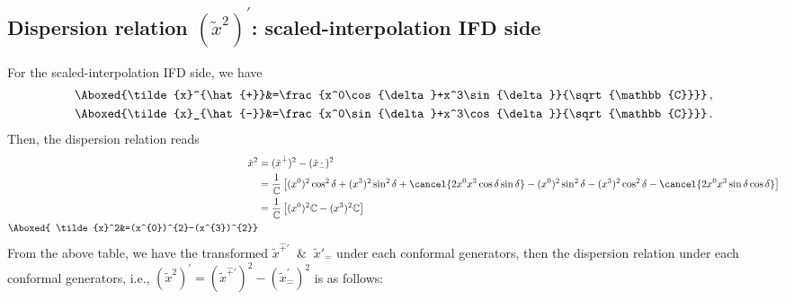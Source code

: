 \documentclass[]{article}
\numberwithin{equation}{section}
\begin{document}
{{\subsection{Dispersion relation $(\tilde{x}^2)^{\prime}$: scaled-interpolation IFD side}
For the scaled-interpolation IFD side, we have
\begin{align}
    \Aboxed{\tilde{x}^{\hat{+}}&=\frac{x^0\cos{\delta}+x^3\sin{\delta}}{\sqrt{\mathbb{C}}}}\,,\\
    \Aboxed{\tilde{x}_{\hat{-}}&=\frac{x^0\sin{\delta}+x^3\cos{\delta}}{\sqrt{\mathbb{C}}}}\,.
\end{align}
Then, the dispersion relation reads
\begin{align}
    \tilde{x}^2&=(\tilde{x}^{\hat{+}})^2-(\tilde{x}_{\hat{-}})^2\\
    &=\frac{1}{\mathbb{C}}\left[(x^0)^{2}\cos^{2}{\delta}+(x^3)^{2}\sin^{2}{\delta}+\cancel{2x^{0}x^{3}\cos{\delta}\sin{\delta}}-(x^0)^{2}\sin^{2}{\delta}-(x^3)^{2}\cos^{2}{\delta}-\cancel{2x^{0}x^{3}\sin{\delta}\cos{\delta}}\right]\\
    &=\frac{1}{\mathbb{C}}\left[(x^0)^{2}\mathbb{C}-(x^3)^{2}\mathbb{C}\right]\\
    \Aboxed{ \tilde{x}^2&=(x^{0})^{2}-(x^{3})^{2}}
\end{align}
From the above table, we have the transformed $\tilde{x}^{\hat{+}\prime}$ $~\&~$ $\tilde{x}'_{\hat{-}}$ under each conformal generators, then the dispersion relation under each conformal generators, i.e., $(\tilde{x}^2)^{\prime}=(\tilde{x}^{\hat{+}\prime})^2-(\tilde{x}^{\prime}_{\hat{-}})^2$ is as follows:
\begin{table}[h!]
        \centering
\end{table}}}
\end{document}
